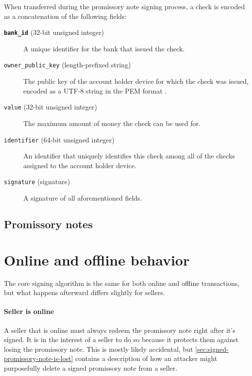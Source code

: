 \documentclass[12pt,a4paper]{article}
\begin{document}
\begin{multicols}{2}
	When transferred during the promissory note signing process, a check is encoded as a concatenation of the following fields:
	
	\begin{description}
		\item[\textbf{\texttt{bank\_id}} (32-bit unsigned integer)] A unique identifier for the bank that issued the check.

		\item[\texttt{owner\_public\_key} (length-prefixed string)] The public key of the account holder device for which the check was issued, encoded as a UTF-8 string in the PEM format \cite{rfc-pem}.

		\item[\texttt{value} (32-bit unsigned  integer)] The maximum amount of money the check can be used for.

		\item[\texttt{identifier} (64-bit unsigned integer)] An identifier that uniquely identifies this check among all of the checks assigned to the account holder device.

		\item[\texttt{signature} (signature)] A signature of all aforementioned fields.
	\end{description}

	\subsection{Promissory notes}
 

	\section{Online and offline behavior}

	The core signing algorithm is the same for both online and offline transactions, but what happens afterward differs slightly for sellers.

	\paragraph{Seller is online}
	
	A seller that is online must always redeem the promissory note right after it's signed. It is in the interest of a seller to do so because it protects them against losing the promissory note. This is mostly likely accidental, but \autoref{sec:signed-promissory-note-is-lost} contains a description of how an attacker might purposefully delete a signed promissory note from a seller.


\end{multicols}
\end{document}
